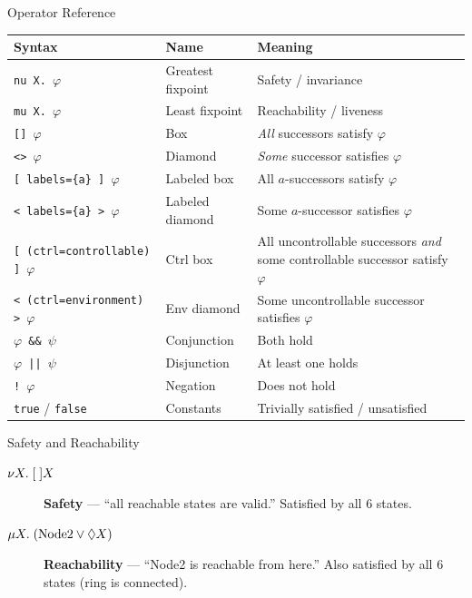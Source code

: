 \begin{frame}{Operator Reference}
  \begin{center}
  \begin{tabularx}{0.92\textwidth}{llX}
    \toprule
    \textbf{Syntax} & \textbf{Name} & \textbf{Meaning} \\
    \midrule
    \texttt{nu X. $\varphi$}  & Greatest fixpoint & Safety / invariance \\
    \texttt{mu X. $\varphi$}  & Least fixpoint    & Reachability / liveness \\
    \midrule
    \texttt{[] $\varphi$}     & Box               & \emph{All} successors satisfy $\varphi$ \\
    \texttt{<> $\varphi$}     & Diamond           & \emph{Some} successor satisfies $\varphi$ \\
    \texttt{[ labels=\{a\} ] $\varphi$} & Labeled box    & All $a$-successors satisfy $\varphi$ \\
    \texttt{< labels=\{a\} > $\varphi$} & Labeled diamond & Some $a$-successor satisfies $\varphi$ \\
    \midrule
    \midrule
    \texttt{[ (ctrl=controllable) ] $\varphi$} & Ctrl box & All uncontrollable successors \emph{and} some controllable successor satisfy $\varphi$ \\
    \texttt{< (ctrl=environment) > $\varphi$} & Env diamond & Some uncontrollable successor satisfies $\varphi$ \\
    \midrule
    \texttt{$\varphi$ \&\& $\psi$} & Conjunction & Both hold \\
    \texttt{$\varphi$ || $\psi$}   & Disjunction & At least one holds \\
    \texttt{! $\varphi$}            & Negation    & Does not hold \\
    \texttt{true} / \texttt{false}  & Constants   & Trivially satisfied / unsatisfied \\
    \bottomrule
  \end{tabularx}
  \end{center}
\end{frame}

\begin{frame}[fragile]{Safety and Reachability}
  

  \bigskip
  \begin{description}
    \item[{$\nu X.\;[\;] X$}] \textbf{Safety} --- ``all reachable states are valid.'' Satisfied by all 6 states.
    \item[{$\mu X.\;(\text{Node2} \lor \lozenge X)$}] \textbf{Reachability} --- ``Node2 is reachable from here.'' Also satisfied by all 6 states (ring is connected).
  \end{description}
\end{frame}

